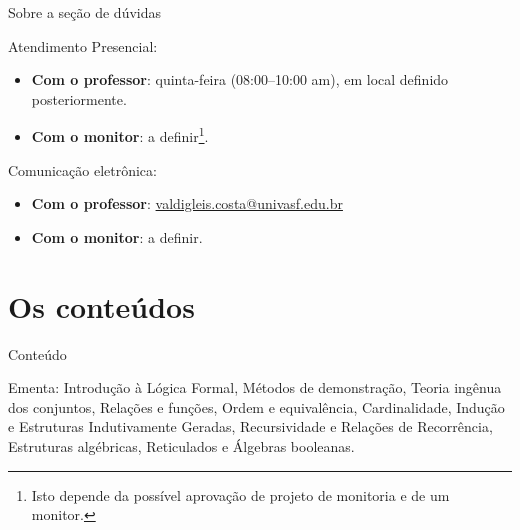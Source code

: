 \documentclass{beamer}
\begin{document}
	\begin{frame}{Sobre a seção de dúvidas}
		\begin{block}{Atendimento Presencial:}
			\begin{itemize}
				\item \textbf{Com o professor}: quinta-feira (08:00--10:00 am), em local definido posteriormente.
				\item \textbf{Com o monitor}: a definir\footnote{Isto depende da possível aprovação de projeto de monitoria e de um monitor.}.
			\end{itemize}
		\end{block}
		\pause
		\begin{block}{Comunicação eletrônica:}
			\begin{itemize}
				\item \textbf{Com o professor}: \url{valdigleis.costa@univasf.edu.br}
				\item \textbf{Com o monitor}: a definir.
			\end{itemize}
		\end{block}
	\end{frame}

	\section{Os conteúdos}
	
	\begin{frame}{Conteúdo}
		\begin{block}{Ementa:}
			Introdução à Lógica Formal,  Métodos de demonstração, Teoria ingênua dos conjuntos, Relações e funções, Ordem e equivalência, Cardinalidade, Indução e Estruturas Indutivamente Geradas, Recursividade e Relações de Recorrência, Estruturas algébricas, Reticulados e Álgebras booleanas.
		\end{block}
	\end{frame}
\end{document}
